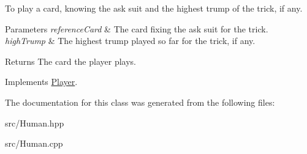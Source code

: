 To play a card, knowing the ask suit and the highest trump of the trick, if any. 


\begin{DoxyParams}{Parameters}
{\em reference\-Card} & The card fixing the ask suit for the trick. \\
\hline
{\em high\-Trump} & The highest trump played so far for the trick, if any. \\
\hline
\end{DoxyParams}
\begin{DoxyReturn}{Returns}
The card the player plays. 
\end{DoxyReturn}


Implements \hyperlink{classPlayer_aeba090a124bfd9a3666d2d793439cae0}{Player}.



The documentation for this class was generated from the following files\-:\begin{DoxyCompactItemize}
\item 
src/Human.\-hpp\item 
src/Human.\-cpp\end{DoxyCompactItemize}
